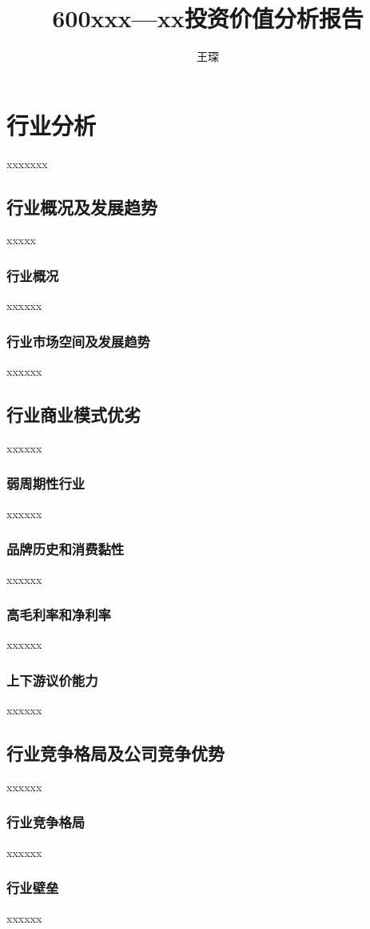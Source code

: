 \documentclass[a4paper,12pt,lang=cn,fontset = windows]{elegantpaper} %
\title{600xxx—xx投资价值分析报告} %
\author{王琛}
\date{\zhtoday}
\begin{document}
\maketitle
\section{行业分析}
xxxxxxx
\subsection{行业概况及发展趋势}
xxxxx
\subsubsection{行业概况}
xxxxxx
\subsubsection{行业市场空间及发展趋势}
xxxxxx
\subsection{行业商业模式优劣}
xxxxxx
\subsubsection{弱周期性行业}
xxxxxx
\subsubsection{品牌历史和消费黏性}
xxxxxx
\subsubsection{高毛利率和净利率}
xxxxxx
\subsubsection{上下游议价能力}
xxxxxx
\subsection{行业竞争格局及公司竞争优势} %
xxxxxx
\subsubsection{行业竞争格局}
xxxxxx
\subsubsection{行业壁垒}
xxxxxx
\end{document}
